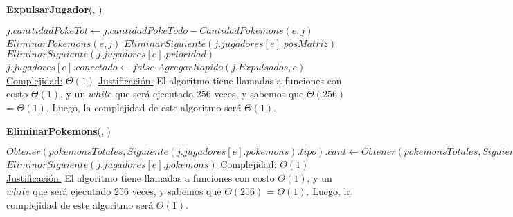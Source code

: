 \begin{algorithm}[H]{\textbf{ExpulsarJugador}(, )}   
    \begin{algorithmic}[1]
        \State $j.canttidadPokeTot \gets j.cantidadPokeTodo - CantidadPokemons(e,j)$
        \State $EliminarPokemons(e,j)$
        \State $EliminarSiguiente(j.jugadores[e].posMatriz)$
            \State $EliminarSiguiente(j.jugadores[e].prioridad)$
        \EndIf
        \State $j.jugadores[e].conectado \gets false$
        \State $AgregarRapido(j.Expulsados, e)$
        \medskip
        \Statex \underline{Complejidad:} $\Theta(1)$
        \Statex \underline{Justificación:}  El algoritmo tiene llamadas a funciones con costo $\Theta(1)$, y un $while$ que será ejecutado 256 veces, y sabemos que $\Theta (256)$ = $\Theta (1)$. Luego, la complejidad de este algoritmo será $\Theta (1)$.
    \end{algorithmic}
\end{algorithm} 

\begin{algorithm}[H]{\textbf{EliminarPokemons}(, )}  
    \begin{algorithmic}[1]
            \State $Obtener(pokemonsTotales, Siguiente(j.jugadores[e].pokemons).tipo).cant \gets Obtener(pokemonsTotales, Siguiente(j.jugadores[e].pokemons).tipo).cant - Siguiente(j.jugadores[e].pokemons).cant$
            \State $EliminarSiguiente(j.jugadores[e].pokemons)$
        \EndWhile
        \medskip
        \Statex \underline{Complejidad:} $\Theta(1)$
        \Statex \underline{Justificación:}  El algoritmo tiene llamadas a funciones con costo $\Theta(1)$, y un $while$ que será ejecutado 256 veces, y sabemos que $\Theta (256)$ = $\Theta (1)$. Luego, la complejidad de este algoritmo será $\Theta (1)$.
    \end{algorithmic}
\end{algorithm} 

